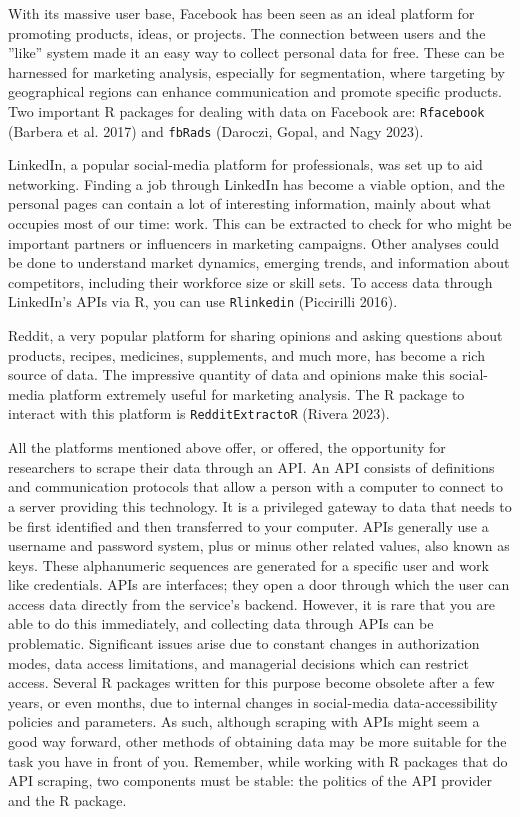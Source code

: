 With its massive user base, Facebook has been seen as an ideal platform for
promoting products, ideas, or projects. The connection between
users and the ''like'' system made it an easy way to collect personal data for free. These can be harnessed for
marketing analysis, especially for segmentation, where targeting by
geographical regions can enhance communication and promote specific
products. Two important R packages for dealing with data on Facebook
are: \texttt{Rfacebook} (Barbera et al. 2017) and \texttt{fbRads}
(Daroczi, Gopal, and Nagy 2023).

LinkedIn, a popular social-media platform for professionals, was set up to aid networking. Finding a job through LinkedIn has become a viable
option, and the personal pages can contain a lot of interesting
information, mainly about what occupies most of our time: work.
This can be extracted to check for who might be important partners or
influencers in marketing campaigns. Other analyses could be done to
understand market dynamics, emerging trends, and information about
competitors, including their workforce size or skill sets. To access
data through LinkedIn's APIs via R, you can use \texttt{Rlinkedin}
(Piccirilli 2016).

Reddit, a very popular platform for sharing opinions and asking
questions about products, recipes, medicines, supplements, and much
more, has become a rich source of data. The impressive quantity of data and
opinions make this social-media platform extremely useful for
marketing analysis. The R package to interact with this platform is \texttt{RedditExtractoR} (Rivera 2023).

All the platforms mentioned above offer, or offered, the opportunity for researchers to scrape their
data through an API. An API consists
of definitions and communication protocols that allow a person with a
computer to connect to a server providing this technology. It is a
privileged gateway to data that needs to be first identified and then
transferred to your computer. APIs generally use a
username and password system, plus or minus other related values, also known
as keys. These alphanumeric sequences are generated for a specific user and work
like credentials. APIs are interfaces; they open a door through which the user can
access data directly from the service's backend. However, it is rare that you are able to do this immediately, and collecting data through APIs can be
problematic. Significant issues arise due to constant changes in
authorization modes, data access limitations, and managerial decisions
which can restrict access. Several R packages written for this purpose
become obsolete after a few years, or even months, due to internal changes
in social-media data-accessibility policies and parameters. As such,
although scraping with APIs might seem a good way forward, other methods of
obtaining data may be more suitable for the task you have in front of you. Remember, while
working with R packages that do API scraping, two components must be
stable: the politics of the API provider and the R package.

